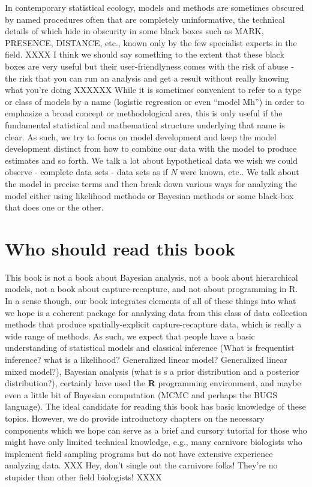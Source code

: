 In contemporary statistical ecology, models and methods are sometimes
obscured by named procedures often that are completely uninformative,
the technical details of which hide in obscurity in some black boxes
such as MARK, PRESENCE, DISTANCE, etc., known only by the few
specialist experts in the field. 
XXXX I think we should say something to the extent that these black boxes are very useful but their user-friendlyness comes with the risk of abuse - the risk that you can run an analysis and get a result without really knowing what you're doing XXXXXX
While it is sometimes convenient to
refer to a type or class of models by a name (logistic regression or
even ``model Mh'') in order to emphasize a broad concept or
methodological area, this is only useful if the fundamental
statistical and mathematical structure underlying that name is
clear. As such, we try to focus on model development and keep the
model development distinct from how to combine our data with the model
to produce estimates and so forth. We talk a lot about hypothetical
data we wish we could observe - complete data sets - data sets as if
$N$ were known, etc.. We talk about the model in precise terms and
then break down various ways for analyzing the model either using
likelihood methods or Bayesian methods or some black-box that does one
or the other.




\section*{Who should read this book}

This book is not a book about Bayesian analysis, not a book about
hierarchical models, not a book about capture-recapture, and not about
programming in R. In a sense though, our book integrates elements of
all of these things into what we hope is a coherent package for
analyzing data from this class of data collection methods
that produce spatially-explicit capture-recapture data, which is really a wide range of methods.   As such, we
expect that people have a basic understanding of statistical models
and classical inference (What is frequentist inference? what is a
likelihood? Generalized linear model? Generalized linear mixed
model?), 
 Bayesian analysis (what is s a prior distribution and a
posterior distribution?),
certainly have used the {\bf R} programming environment,
and maybe even a little bit
of Bayesian
computation (MCMC and perhaps the BUGS language).
The ideal candidate for reading this book has basic knowledge of these
topics. However, we do provide introductory chapters on the necessary
components which we hope can serve as a brief and cursory tutorial for
those who might have only limited technical knowledge, e.g., many
carnivore biologists who implement field sampling programs but do not
have extensive experience analyzing data.
XXX Hey, don't single out the carnivore folks! They're no stupider than other field biologists! XXXX

